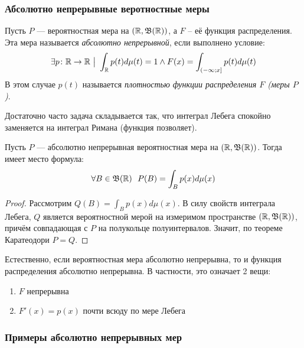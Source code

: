 \subsubsection{Абсолютно непрерывные веротностные меры}

\begin{definition}
	Пусть $P$ --- вероятностная мера на $(\mathbb{R}, \mathfrak{B}(\mathbb{R}))$, а $F$ -- её функция распределения. Эта мера называется \textit{абсолютно непрерывной}, если выполнено условие:
	\[
		\exists p \colon \mathbb{R} \to \mathbb{R} \ \big|\  \int_{\mathbb{R}} p(t)d\mu(t) = 1 \wedge F(x) = \int_{\left(-\infty; x\right]} p(t)d\mu(t)
	\]
	В этом случае $p(t)$ называется \textit{плотностью функции распределения $F$ (меры $P$)}.
\end{definition}

\begin{note}
	Достаточно часто задача складывается так, что интеграл Лебега спокойно заменяется на интеграл Римана (функция позволяет).
\end{note}

\begin{proposition}
	Пусть $P$ --- абсолютно непрерывная вероятностная мера на $(\mathbb{R}, \mathfrak{B}(\mathbb{R}))$. Тогда имеет место формула:
	\[
		\forall B \in \mathfrak{B}(\mathbb{R})\ \ P(B) = \int_B p(x)d\mu(x)
	\]
\end{proposition}

\begin{proof}
	Рассмотрим $Q(B) = \int_B p(x)d\mu(x)$. В силу свойств интеграла Лебега, $Q$ является вероятностной мерой на измеримом пространстве $(\mathbb{R}, \mathfrak{B}(\mathbb{R}))$, причём совпадающая с $P$ на полукольце полуинтервалов. Значит, по теореме Каратеодори $P = Q$.
\end{proof}

\begin{note}
	Естественно, если вероятностная мера абсолютно непрерывна, то и функция распределения абсолютно непрерывна. В частности, это означает 2 вещи:
	\begin{enumerate}
		\item $F$ непрерывна
		
		\item $F'(x) = p(x)$ почти всюду по мере Лебега
	\end{enumerate}
\end{note}

\subsubsection*{Примеры абсолютно непрерывных мер}

